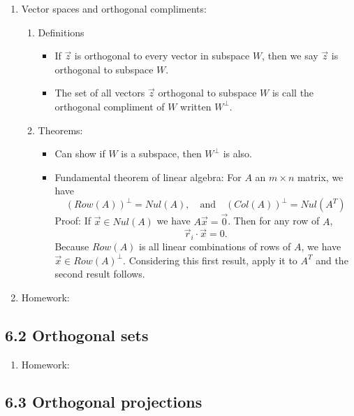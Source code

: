 \documentclass{article}
\begin{document}
\begin{enumerate}
\item Vector spaces and orthogonal compliments:
\begin{enumerate}
\item Definitions
\begin{itemize}
\item If $\vec{z}$ is orthogonal to every vector in subspace $W$, then we say $\vec{z}$ is orthogonal to subspace $W$.
\item The set of all vectors $\vec{z}$ orthogonal to subspace $W$ is call the orthogonal compliment of $W$ written $W^{\perp}$.
\end{itemize}
\item Theorems: 
\begin{itemize}
\item Can show if $W$ is a subspace, then $W^{\perp}$ is also. 
\item Fundamental theorem of linear algebra: For $A$ an $m \times n$ matrix, we have
\[
(Row(A))^{\perp} = Nul(A), \quad \text{and} \quad (Col(A))^{\perp}= Nul(A^T)
\]
Proof: If $\vec{x} \in Nul(A)$ we have $A\vec{x} = \vec{0}$. Then for any row of $A$, 
\[
\vec{r}_i \cdot \vec{x} = 0.
\]
Because $Row(A)$ is all linear combinations of rows of $A$, we have $\vec{x} \in Row(A)^{\perp}$. Considering this first result, apply it to $A^T$ and the second result follows.
\end{itemize}
\end{enumerate}

\item Homework: 

\end{enumerate}

\subsection{6.2 Orthogonal sets}

\begin{enumerate}

\item Homework: 

\end{enumerate}

\subsection{6.3 Orthogonal projections}
\end{document}
